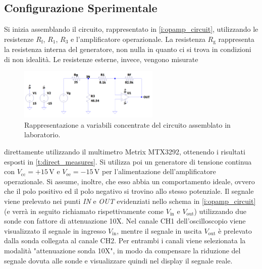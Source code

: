 \documentclass[a4paper,11pt]{article} %
\begin{document}

\subsection{Configurazione Sperimentale}\label{s:guadagno}

Si inizia assemblando il circuito, rappresentato in \autoref{i:opamp_circuit}, utilizzando le resistenze $R_{\text{f}}$, $R_1$,
$R_3$ e l'amplificatore operazionale. La resistenza $R_{\text{g}}$ rappresenta la resistenza interna del generatore, non nulla in
quanto ci si trova in condizioni di non idealità. Le resistenze esterne, invece, vengono misurate

\begin{figure}
	\centering
	\includegraphics[width=0.6\textwidth]{../Simulations/OpAmp/circuit_image_nosim.png}
	\caption{\footnotesize Rappresentazione a variabili concentrate del circuito assemblato in laboratorio.}
	\label{i:opamp_circuit}
\end{figure}

\noindent direttamente utilizzando il multimetro Metrix MTX3292, ottenendo i risultati esposti in
\autoref{t:direct_measures}. Si utilizza poi un generatore di tensione continua con $V_{\text{cc}}=+15\,\si{\volt}$ e
$V_{\text{ee}}=-15\,\si{\volt}$ per l'alimentazione dell'amplificatore operazionale. Si assume, inoltre, che esso abbia
un comportamento ideale, ovvero che il polo positivo ed il polo negativo si trovino allo stesso potenziale. Il segnale
viene prelevato nei punti \textit{IN} e \textit{OUT} evidenziati nello schema in \autoref{i:opamp_circuit} (e verrà in
seguito richiamato rispettivamente come $V_{\text{in}}$ e $V_{\text{out}}$) utilizzando due sonde con fattore di
attenuazione 10X. Nel canale CH1 dell'oscilloscopio viene visualizzato il segnale in ingresso $V_{\text{in}}$, mentre il
segnale in uscita $V_{\text{out}}$ è prelevato dalla sonda collegata al canale CH2. Per entrambi i canali viene
selezionata la modalità "attenuazione sonda 10X", in modo da compensare la riduzione del segnale dovuta alle sonde e
visualizzare quindi nel display il segnale reale. 
\end{document}
